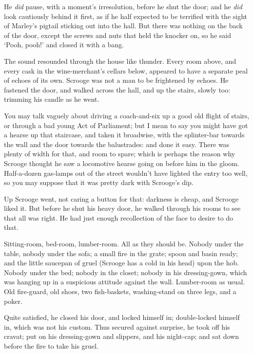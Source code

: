 \documentclass[11pt,twoside]{article}\makeatletter
\begin{document}
He \textit{did} pause, with a moment's irresolution, before he shut the door; and he \textit{did} look cautiously behind it first, as if he half expected to be terrified with the sight of Marley's pigtail sticking out into the hall.  But there was nothing on the back of the door, except the screws and nuts that held the knocker on, so he said ‘Pooh, pooh!’ and closed it with a bang.  \par
The sound resounded through the house like thunder. Every room above, and every cask in the wine-merchant's cellars below, appeared to have a separate peal of echoes of its own.  Scrooge was not a man to be frightened by echoes. He fastened the door, and walked across the hall, and up the stairs, slowly too: trimming his candle as he went.  \par
You may talk vaguely about driving a coach-and-six up a good old flight of stairs, or through a bad young Act of Parliament; but I mean to say you might have got a hearse up that staircase, and taken it broadwise, with the splinter-bar towards the wall and the door towards the balustrades: and done it easy.  There was plenty of width for that, and room to spare; which is perhaps the reason why Scrooge thought he saw a locomotive hearse going on before him in the gloom. Half-a-dozen gas-lamps out of the street wouldn't have lighted the entry too well, so you may suppose that it was pretty dark with Scrooge's dip.  \par
Up Scrooge went, not caring a button for that: darkness is cheap, and Scrooge liked it.  But before he shut his heavy door, he walked through his rooms to see that all was right. He had just enough recollection of the face to desire to do that.  \par
Sitting-room, bed-room, lumber-room.  All as they should be.  Nobody under the table, nobody under the sofa; a small fire in the grate; spoon and basin ready; and the little saucepan of gruel (Scrooge has a cold in his head) upon the hob. Nobody under the bed; nobody in the closet; nobody in his dressing-gown, which was hanging up in a suspicious attitude against the wall.  Lumber-room as usual.  Old fire-guard, old shoes, two fish-baskets, washing-stand on three legs, and a poker.  \par
Quite satisfied, he closed his door, and locked himself in; double-locked himself in, which was not his custom.  Thus secured against surprise, he took off his cravat; put on his dressing-gown and slippers, and his night-cap; and sat down before the fire to take his gruel.  \par
\end{document}
